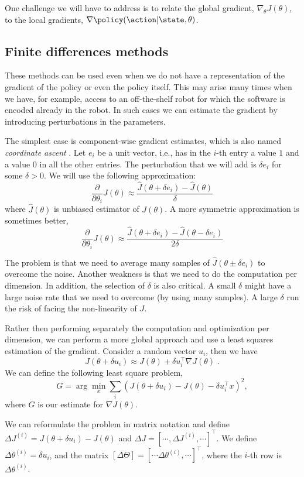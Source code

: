 One challenge we will have to address is to relate the global gradient, $\nabla_\theta J(\theta)$, to the local gradients, $\nabla \policy(\action|\state,\theta)$.

\subsection{Finite differences methods}

These methods can be used even when we do not have a representation
of the gradient of the policy or even the policy itself. This may
arise many times when we have, for example, access to an
off-the-shelf robot for which the software is encoded already in the
robot. In such cases we can estimate the gradient by introducing
perturbations in the parameters.

The simplest case is component-wise gradient estimates, which is also named \emph{coordinate ascent} . Let $e_i$ be
a unit vector, i.e., has in the $i$-th entry a value $1$ and a value
$0$ in all the other entries. The perturbation that we will add is
$\delta e_i$ for some $\delta >0$. We will use the following
approximation:
\[
\frac{\partial}{\partial \theta_i}J(\theta)\approx
\frac{\hat{J}(\theta+\delta e_i)-\hat{J}(\theta)}{\delta}
\]
where $\hat{J}(\theta)$ is unbiased estimator of $J(\theta)$. A more
symmetric approximation is sometimes better,
\[
\frac{\partial}{\partial \theta_i}J(\theta)\approx
\frac{\hat{J}(\theta+\delta e_i)-\hat{J}(\theta-\delta e_i
)}{2\delta}
\]

The problem is that we need to average many samples of
$\hat{J}(\theta\pm\delta e_i)$ to overcome the noise. Another
weakness is that we need to do the computation per dimension. In
addition, the selection of $\delta$ is also critical. A small
$\delta$ might have a large noise rate that we need to overcome (by
using many samples). A large $\delta$ run the risk of facing the
non-linearity of $J$.

Rather then performing separately the computation and optimization per dimension, we can perform a more global approach and use a least squares estimation of the gradient.
Consider a random vector $u_i$, then we have
\[
J(\theta+\delta u_i)\approx J(\theta)+\delta u_i^\top \nabla
J(\theta) \;.
\]
We can define the following least square problem,
\[
G= \arg\min_x \sum_i (J(\theta+\delta u_i)- J(\theta)-\delta
u_i^\top x)^2,
\]
where $G$ is our estimate for $\nabla J(\theta)$.

We can reformulate the problem in matrix notation and define $\Delta
J^{(i)}=J(\theta+\delta u_i)- J(\theta)$ and $\Delta J= [\cdots ,
\Delta J^{(i)}, \cdots]^\top$. We define $\Delta \theta^{(i)}=\delta
u_i$, and the matrix $[\Delta\Theta]=[\cdots
\Delta\theta^{(i)},\cdots]^\top$, where the $i$-th row is
$\Delta\theta^{(i)}$.

